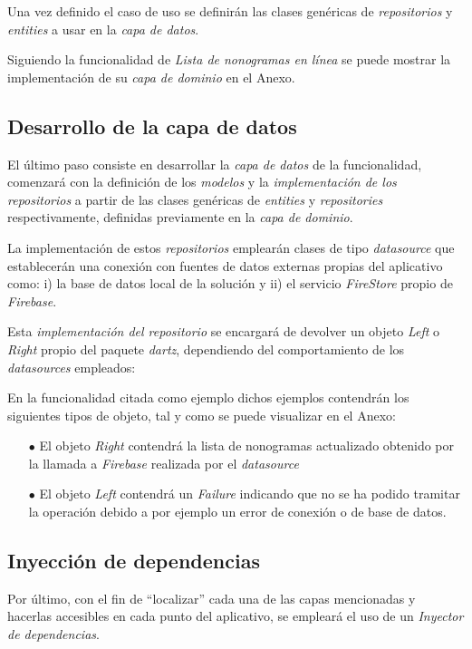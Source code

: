 Una vez definido el caso de uso se definirán las clases genéricas de \textit{repositorios} y \textit{entities} a usar en la
\textit{capa de datos}.

Siguiendo la funcionalidad de \textit{Lista de nonogramas en línea} se puede mostrar la implementación de su \textit{capa 
de dominio} en el Anexo.

\subsection{Desarrollo de la capa de datos}
El último paso consiste en desarrollar la \textit{capa de datos} de la funcionalidad, comenzará con la definición de los
\textit{modelos} y la \textit{implementación de los repositorios} a partir de las clases genéricas de \textit{entities} y
\textit{repositories} respectivamente, definidas previamente en la \textit{capa de dominio}.

La implementación de estos \textit{repositorios} emplearán clases de tipo \textit{datasource} que establecerán una conexión
con fuentes de datos externas propias del aplicativo como: i) la base de datos local de la solución y ii) el 
servicio \textit{FireStore} propio de \textit{Firebase}.

Esta \textit{implementación del repositorio} se encargará de
devolver un objeto \textit{Left} o \textit{Right} propio del paquete \textit{dartz}, dependiendo del comportamiento de 
los \textit{datasources} empleados: 

En la funcionalidad citada como ejemplo dichos ejemplos contendrán los siguientes tipos de objeto, tal y como se puede visualizar
en el Anexo:
\begin{itemize}
  \item[$\bullet$] El objeto \textit{Right} contendrá la lista de nonogramas actualizado obtenido por la llamada a \textit{Firebase} realizada por el 
  \textit{datasource}
  \item[$\bullet$] El objeto \textit{Left} contendrá un \textit{Failure} indicando que no se ha podido tramitar la operación 
  debido a por ejemplo un error de conexión o de base de datos.
\end{itemize}

\subsection{Inyección de dependencias}
Por último, con el fin de ``localizar'' cada una de las capas mencionadas y hacerlas accesibles en cada punto del aplicativo,
se empleará el uso de un \textit{Inyector de dependencias}. 


